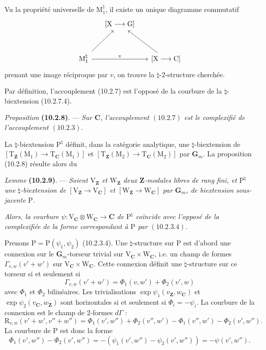 \documentclass[11pt,leqno]{article}
\begin{document}
Vu la propriété universelle de \(\mathrm{M}_1^{\natural}\),
il existe un unique diagramme commutatif
\[
\begin{tikzcd}[row sep=3em, column sep=1.5em]
& {[\mathrm{X}\longrightarrow\mathrm{G}]} &\\
\mathrm{M}_1^{\natural}
  \arrow[ur] \arrow[rr, "v"]
&& {[\mathrm{X}\longrightarrow\mathrm{C}]} \arrow[ul]
\end{tikzcd}
\]
prenant une image réciproque par \(v\), on trouve la
\(\natural\)-2-structure cherchée.

Par définition, l’accouplement (10.2.7) est l’opposé de la
courbure de la \(\natural\)-biextension (10.2.7.4).

\textit{Proposition} \textbf{(10.2.8)}. — \textit{Sur
\(\mathbf{C}\), l’accouplement \((10.2.7)\) est le complexifié
de l’accouplement \((10.2.3)\).}

La \(\natural\)-biextension \(\mathrm{P}^{\natural}\) définit,
dans la catégorie analytique, une \(\natural\)-biextension de
\([\mathrm{T}_{\mathbf{Z}}(\mathrm{M}_1)\to
\mathrm{T}_{\mathbf{C}}(\mathrm{M}_1)]\) et
\([\mathrm{T}_{\mathbf{Z}}(\mathrm{M}_2)\to
\mathrm{T}_{\mathbf{C}}(\mathrm{M}_2)]\) par \(\mathbf{G}_m\).
La proposition (10.2.8) résulte alors du

\textit{Lemme} \textbf{(10.2.9)}. — \textit{Soient
\(\mathrm{V}_{\mathbf{Z}}\) et \(\mathrm{W}_{\mathbf{Z}}\)
deux \(\mathbf{Z}\)-modules libres de rang fini, et \(\mathrm{P}^{\natural}\)
une \(\natural\)-biextension de
\([\mathrm{V}_{\mathbf{Z}}\to\mathrm{V}_{\mathbf{C}}]\) et
\([\mathrm{W}_{\mathbf{Z}}\to\mathrm{W}_{\mathbf{C}}]\) par
\(\mathbf{G}_m\), de biextension sous-jacente \(\mathrm{P}\).}

\textit{Alors, la courbure
\(\psi:\mathrm{V}_{\mathbf{C}}\otimes\mathrm{W}_{\mathbf{C}}
\to\mathbf{C}\) de \(\mathrm{P}^{\natural}\) coïncide avec
l’opposé de la complexifiée de la forme correspondant à
\(\mathrm{P}\) par \((10.2.3.4)\).}

Prenons \(\mathrm{P}=\mathrm{P}(\psi_1,\psi_2)\) (10.2.3.4).
Une \(\natural\)-structure sur \(\mathrm{P}\) est d’abord une
connexion sur le \(\mathbf{G}_m\)-torseur trivial sur
\(\mathrm{V}_{\mathbf{C}}\times\mathrm{W}_{\mathbf{C}}\),
i.e. un champ de formes \(\Gamma_{v,w}(v'+w')\) sur
\(\mathrm{V}_{\mathbf{C}}\times\mathrm{W}_{\mathbf{C}}\).
Cette connexion définit une \(\natural\)-structure sur ce
torseur si et seulement si
\[
\Gamma_{v,w}(v'+w')=\Phi_1(v,w')+\Phi_2(v',w)
\]
avec \(\Phi_1\) et \(\Phi_2\) bilinéaires.
Les trivialisations \(\exp\psi_1(v_{\mathbf{Z}},w_{\mathbf{C}})\)
et \(\exp\psi_2(v_{\mathbf{C}},w_{\mathbf{Z}})\) sont
horizontales si et seulement si \(\Phi_i=-\psi_i\).
La courbure de la connexion est le champ de 2-formes \(d\Gamma\) :
\[
\mathrm{R}_{v,w}(v'+w',v''+w'')
=\Phi_1(v',w'')+\Phi_2(v'',w')
-\Phi_1(v'',w')-\Phi_2(v',w'').
\]
La courbure de \(\mathrm{P}\) est donc la forme
\[
\Phi_1(v',w'')-\Phi_2(v',w'')
=-(\psi_1(v',w'')-\psi_2(v',w''))
=-\psi(v',w'').
\]
\end{document}
